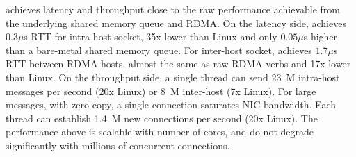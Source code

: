
\sys{} achieves latency and throughput close to the raw performance achievable from the underlying shared memory queue and RDMA.
On the latency side, \sys{} achieves $0.3\mu$s RTT for intra-host socket, 35x lower than Linux and only $0.05\mu$s higher than a bare-metal shared memory queue. For inter-host socket, \sys{} achieves $1.7\mu$s RTT between RDMA hosts, almost the same as raw RDMA verbs and 17x lower than Linux.
On the throughput side, a single thread can send 23~M intra-host messages per second (20x Linux) or 8~M inter-host (7x Linux). For large messages, with zero copy, a single connection saturates NIC bandwidth. Each thread can establish 1.4~M new connections per second (20x Linux). The performance above is scalable with number of cores, and do not degrade significantly with millions of concurrent connections.



\iffalse
This paper makes the following contributions:
\begin{ecompact}
	\item A Linux compatible, secure and high performance user-space socket system that supports both inter-process, inter-container and inter-host communication.
	\item A per-host monitor daemon for trusted control plane and peer-to-peer queues for scalable data plane.
	\item A multi-sender and multi-receiver lockless queue to fully support fork and multi-thread socket sharing.
	\item A memory efficient message queue that multiplexes multiple sockets and allows fetching from any socket, while using shared memory and RDMA transports efficiently.
\end{ecompact}
\fi